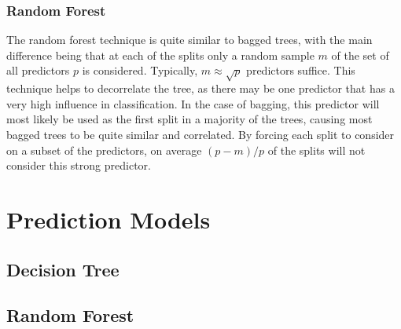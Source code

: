 \documentclass[preprint,12pt]{elsarticle}
\begin{document}
\subsubsection{Random Forest}
The random forest technique is quite similar to bagged trees, with the main difference being that at each of the splits only a random sample $m$ of the set of all predictors $p$ is considered. Typically, $m \approx \sqrt{p}$ predictors suffice. This technique helps to decorrelate the tree, as there may be one predictor that has a very high influence in classification. In the case of bagging, this predictor will most likely be used as the first split in a majority of the trees, causing most bagged trees to be quite similar and correlated. By forcing each split to consider on a subset of the predictors, on average $(p-m)/p$ of the splits will not consider this strong predictor.


\section{Prediction Models}
\subsection{Decision Tree}
\subsection{Random Forest}



\end{document}
